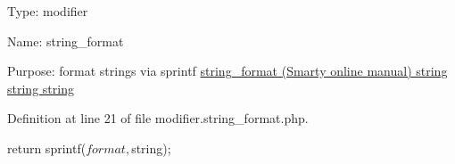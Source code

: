 \-Type\-: modifier\par
 \-Name\-: string\-\_\-format\par
 \-Purpose\-: format strings via sprintf \hyperlink{}{string\-\_\-format (\-Smarty online manual)  string  string  string }

\-Definition at line 21 of file modifier.\-string\-\_\-format.\-php.


\begin{DoxyCode}
{
    return sprintf($format, $string);
}
\end{DoxyCode}

